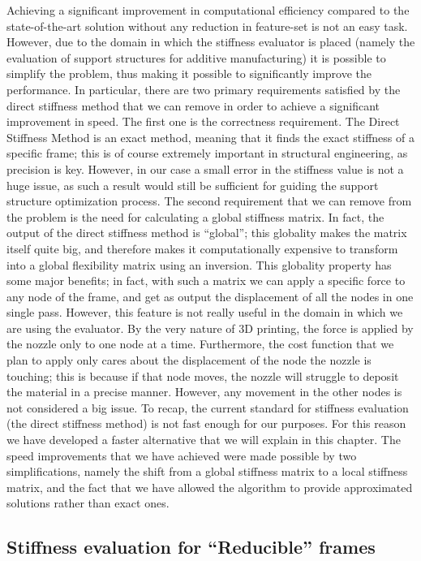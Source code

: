 Achieving a significant improvement in computational efficiency compared
to the state-of-the-art solution without any reduction in feature-set is not an easy task.
However, due to the domain in which the stiffness evaluator is placed (namely the evaluation
of support structures for additive manufacturing) it is possible to simplify the problem,
thus making it possible to significantly improve the performance.
In particular, there are two primary requirements satisfied by the direct stiffness method
that we can remove in order to achieve a significant improvement in speed.
The first one is the correctness requirement. The Direct Stiffness Method is an exact method,
meaning that it finds the exact stiffness of a specific frame; this is of course extremely
important in structural engineering, as precision is key. However, in our case a small
error in the stiffness value is not a huge issue, as such
a result would still be sufficient for guiding the support structure optimization process.
The second requirement that we can remove from the problem is the need for calculating
a global stiffness matrix.
In fact, the output of the direct stiffness method is ``global'';
this globality makes the matrix itself quite big, and therefore makes it computationally
expensive to transform into a global flexibility matrix using an inversion.
This globality property has some major benefits; in fact, with such a matrix
we can apply a specific force to any node of the frame, and get as output the displacement
of all the nodes in one single pass.
However, this feature is not really useful in the domain in which we are using the evaluator.
By the very nature of 3D printing, the force is applied by the nozzle only to one node at a time.
Furthermore, the cost function that we plan to apply only cares about the displacement of the node
the nozzle is touching; this is because if that node moves, the nozzle will struggle to deposit the material
in a precise manner. However, any movement in the other nodes is not considered a big issue.
To recap, the current standard for stiffness evaluation (the direct stiffness method) is not fast enough
for our purposes. For this reason we have developed a faster alternative that we will explain in this chapter.
The speed improvements that we have achieved were made possible by two simplifications, namely
the shift from a global stiffness matrix to a local stiffness matrix, and the fact that we have
allowed the algorithm to provide approximated solutions rather than exact ones.

\subsection{Stiffness evaluation for ``Reducible'' frames}

